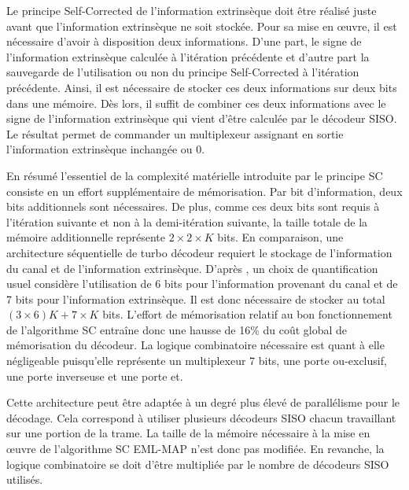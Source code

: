 Le principe Self-Corrected de l’information extrinsèque doit être réalisé juste avant que l'information extrinsèque ne soit stockée. 
Pour sa mise en œuvre, il est nécessaire d'avoir à disposition deux informations. D'une part, le signe de l'information 
extrinsèque calculée à l'itération précédente et d'autre part la sauvegarde de l'utilisation ou non du principe Self-Corrected à 
l'itération précédente. Ainsi, il est nécessaire de stocker ces deux informations sur deux bits dans une mémoire. Dès lors, 
il suffit de combiner ces deux informations avec le signe de l'information extrinsèque qui vient d'être 
calculée par le décodeur SISO. Le résultat permet de commander un multiplexeur assignant en sortie l'information extrinsèque 
inchangée ou 0.

En résumé l'essentiel de la complexité matérielle introduite par le principe SC consiste en un effort supplémentaire de mémorisation. Par bit 
d'information, deux bits additionnels sont nécessaires. De plus, comme ces deux bits sont 
requis à l'itération suivante et non à la demi-itération suivante, la taille totale de la mémoire additionnelle 
représente $2 \times 2 \times K$ bits. En comparaison, une architecture séquentielle de turbo décodeur requiert le stockage
de  l'information du canal et de l'information extrinsèque. D'après \cite{livre_declercq}, un choix de quantification 
usuel considère l'utilisation de 6 bits pour l'information provenant du canal et de 7 bits pour l'information extrinsèque.
Il est donc nécessaire de stocker au total $(3\times 6)K + 7\times K$ bits. L'effort de mémorisation relatif au bon 
fonctionnement de l'algorithme SC entraîne donc une hausse de 16\% du coût global de mémorisation du décodeur.
La logique combinatoire nécessaire est quant à elle négligeable puisqu'elle
représente un multiplexeur 7 bits, une porte ou-exclusif, une porte inverseuse et une porte et.

Cette architecture peut être adaptée à un degré plus élevé de parallélisme pour le décodage. Cela correspond à utiliser plusieurs décodeurs SISO chacun 
travaillant sur une portion de la trame. La taille de la mémoire nécessaire à la mise en œuvre de l'algorithme SC EML-MAP n'est donc pas modifiée. En revanche, la logique combinatoire
se doit d'être multipliée par le nombre de décodeurs SISO utilisés.


